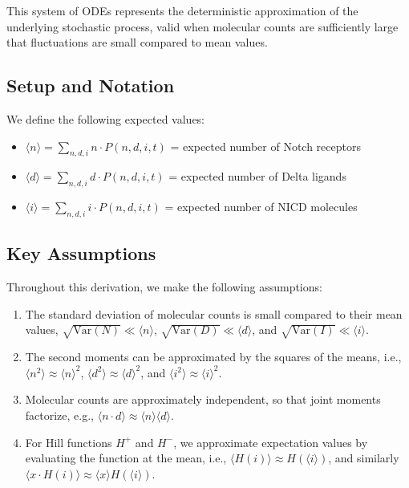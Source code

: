 \documentclass{article}
\begin{document}
\begin{flushleft}
This system of ODEs represents the deterministic approximation of the underlying stochastic process, valid when molecular counts are sufficiently large that fluctuations are small compared to mean values.

\subsection*{Setup and Notation}

We define the following expected values:
\begin{itemize}
  \item $\langle n \rangle = \sum_{n,d,i} n \cdot P(n,d,i,t)$ = expected number of Notch receptors
  \item $\langle d \rangle = \sum_{n,d,i} d \cdot P(n,d,i,t)$ = expected number of Delta ligands
  \item $\langle i \rangle = \sum_{n,d,i} i \cdot P(n,d,i,t)$ = expected number of NICD molecules
\end{itemize}

\subsection*{Key Assumptions}
Throughout this derivation, we make the following assumptions:
\begin{enumerate}
  \item The standard deviation of molecular counts is small compared to their mean values, $\sqrt{\text{Var}(N)} \ll \langle n \rangle$, $\sqrt{\text{Var}(D)} \ll \langle d \rangle$, and $\sqrt{\text{Var}(I)} \ll \langle i \rangle$.
  
  \item The second moments can be approximated by the squares of the means, i.e., $\langle n^2 \rangle \approx \langle n \rangle^2$, $\langle d^2 \rangle \approx \langle d \rangle^2$, and $\langle i^2 \rangle \approx \langle i \rangle^2$.
  
  \item Molecular counts are approximately independent, so that joint moments factorize, e.g., $\langle n \cdot d \rangle \approx \langle n \rangle \langle d \rangle$.
  
  \item For Hill functions $H^+$ and $H^-$, we approximate expectation values by evaluating the function at the mean, i.e., $\langle H(i) \rangle \approx H(\langle i \rangle)$, and similarly $\langle x \cdot H(i) \rangle \approx \langle x \rangle H(\langle i \rangle)$.
\end{enumerate}


\end{flushleft}
\end{document}
